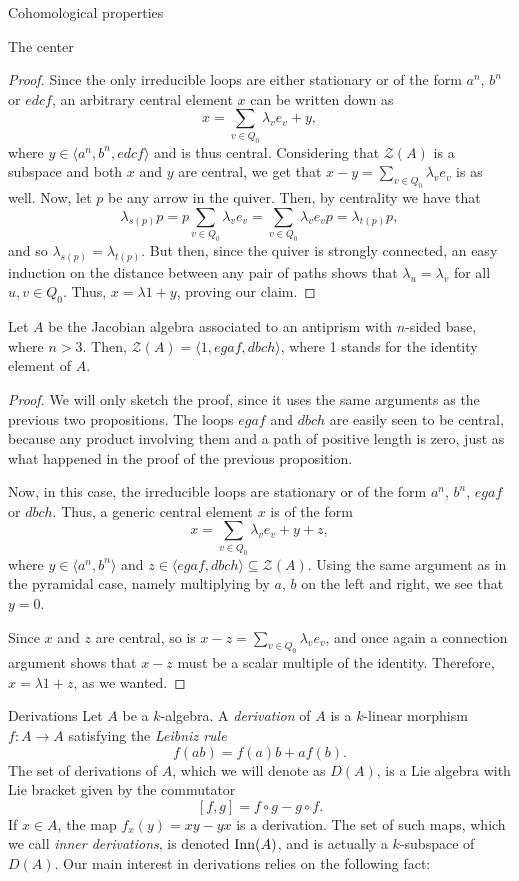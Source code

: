 \begin{chapter}{Cohomological properties}
\begin{section}{The center}
\begin{proof}
Since the only irreducible loops are either stationary or of the form $a^n$, $b^n$ or $edcf$, an arbitrary central element $x$ can be written down as 
\[x = \sum_{v\in Q_0} \lambda_v e_v + y,\]
where $y\in \langle a^n,b^n, edcf\rangle$ and is thus central. Considering that $\mathcal{Z}(A)$ is a subspace and both $x$ and $y$ are central, we get that $x-y=\sum_{v\in Q_0} \lambda_v e_v$ is as well. Now, let $p$ be any arrow in the quiver. Then, by centrality we have that
\[\lambda_{s(p)}p= p\sum_{v\in Q_0} \lambda_v e_v=\sum_{v\in Q_0} \lambda_v e_vp = \lambda_{t(p)}p,\]
and so $\lambda_{s(p)}=\lambda_{t(p)}$. But then, since the quiver is strongly connected, an easy induction on the distance between any pair of paths shows that $\lambda_u=\lambda_v$ for all $u,v\in Q_0$. Thus, $x= \lambda 1 +y$, proving our claim.
\end{proof}

\begin{prop} Let $A$ be the Jacobian algebra associated to an antiprism with $n$-sided base, where $n>3$. Then, $\mathcal{Z}(A) = \langle 1, egaf, dbch\rangle$, where 1 stands for the identity element of $A$.
\end{prop}
\begin{proof} We will only sketch the proof, since it uses the same arguments as the previous two propositions. The loops $egaf$ and $dbch$ are easily seen to be central, because any product involving them and a path of positive length is zero, just as what happened in the proof of the previous proposition.

Now, in this case, the irreducible loops are stationary or of the form $a^n$, $b^n$, $egaf$ or $dbch$. Thus, a generic central element $x$ is of the form
\[x = \sum_{v\in Q_0} \lambda_v e_v + y + z,\]
where $y\in\langle a^n, b^n\rangle$ and $z\in\langle egaf, dbch\rangle\subseteq \mathcal{Z}(A)$. Using the same argument as in the pyramidal case, namely multiplying by $a$, $b$ on the left and right, we see that $y=0$.

Since $x$ and $z$ are central, so is $x-z= \sum_{v\in Q_0} \lambda_v e_v$, and once again a connection argument shows that $x-z$ must be a scalar multiple of the identity. Therefore, $x=\lambda 1 + z$, as we wanted.
\end{proof}
\end{section}

\begin{section}{Derivations}
Let $A$ be a $k$-algebra. A \emph{derivation} of $A$ is a $k$-linear morphism $f:A\to A$ satisfying the \emph{Leibniz rule}
\[f(ab)=f(a)b+af(b).\]
The set of derivations of $A$, which we will denote as $D(A)$, is a Lie algebra with Lie bracket given by the commutator
\[[f,g] = f\circ g - g\circ f.\]
If $x\in A$, the map $f_x(y) = xy-yx$ is a derivation. The set of such maps, which we call \emph{inner derivations}, is denoted $\operatorname{Inn}(A)$, and is actually a $k$-subspace of $D(A)$. Our main interest in derivations relies on the following fact:


\end{section}
\end{chapter}
